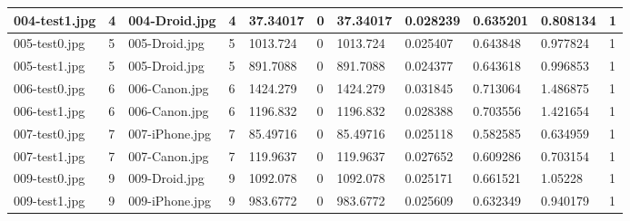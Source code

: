 \begin{landscape}
\begin{longtable}{|p{2cm}|p{1cm}|p{2cm}|p{1cm}|p{2cm}|p{1cm}|p{2cm}|p{2cm}|p{2cm}|p{2cm}|p{1cm}|}
		004-test1.jpg   & 4                & 004-Droid.jpg         & 4                           & 37.34017              & 0                       & 37.34017                   & 0.028239              & 0.635201              & 0.808134                 & 1                \\ \hline
		005-test0.jpg   & 5                & 005-Droid.jpg         & 5                           & 1013.724              & 0                       & 1013.724                   & 0.025407              & 0.643848              & 0.977824                 & 1                \\ \hline
		005-test1.jpg   & 5                & 005-Droid.jpg         & 5                           & 891.7088              & 0                       & 891.7088                   & 0.024377              & 0.643618              & 0.996853                 & 1                \\ \hline
		006-test0.jpg   & 6                & 006-Canon.jpg         & 6                           & 1424.279              & 0                       & 1424.279                   & 0.031845              & 0.713064              & 1.486875                 & 1                \\ \hline
		006-test1.jpg   & 6                & 006-Canon.jpg         & 6                           & 1196.832              & 0                       & 1196.832                   & 0.028388              & 0.703556              & 1.421654                 & 1                \\ \hline
		007-test0.jpg   & 7                & 007-iPhone.jpg        & 7                           & 85.49716              & 0                       & 85.49716                   & 0.025118              & 0.582585              & 0.634959                 & 1                \\ \hline
		007-test1.jpg   & 7                & 007-Canon.jpg         & 7                           & 119.9637              & 0                       & 119.9637                   & 0.027652              & 0.609286              & 0.703154                 & 1                \\ \hline
		009-test0.jpg   & 9                & 009-Droid.jpg         & 9                           & 1092.078              & 0                       & 1092.078                   & 0.025171              & 0.661521              & 1.05228                  & 1                \\ \hline
		009-test1.jpg   & 9                & 009-iPhone.jpg        & 9                           & 983.6772              & 0                       & 983.6772                   & 0.025609              & 0.632349              & 0.940179                 & 1                \\ \hline

\end{longtable}
\end{landscape}
